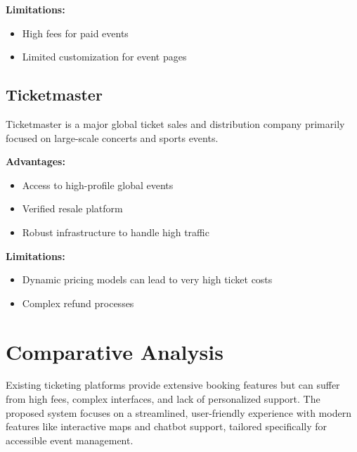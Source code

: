 \documentclass[12pt]{report}
\begin{document}
\textbf{Limitations:}
\begin{itemize}
\item High fees for paid events
\item Limited customization for event pages
\end{itemize}

\subsection{Ticketmaster}
Ticketmaster is a major global ticket sales and distribution company primarily focused on large-scale concerts and sports events.

\textbf{Advantages:}
\begin{itemize}
\item Access to high-profile global events
\item Verified resale platform
\item Robust infrastructure to handle high traffic
\end{itemize}

\textbf{Limitations:}
\begin{itemize}
\item Dynamic pricing models can lead to very high ticket costs
\item Complex refund processes
\end{itemize}

\section{Comparative Analysis}
Existing ticketing platforms provide extensive booking features but can suffer from high fees, complex interfaces, and lack of personalized support.
The proposed system focuses on a streamlined, user-friendly experience with modern features like interactive maps and chatbot support, tailored specifically for accessible event management.

\begin{table}[h!]
\centering
{}
\caption{Comparison of Event Ticketing Platforms}
\end{table}
\end{document}
